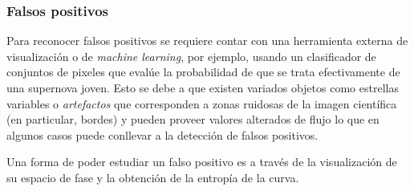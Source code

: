 \subsubsection{Falsos positivos}
Para reconocer falsos positivos se requiere contar con una herramienta externa de visualizaci\'on o de \textit{machine learning}, por ejemplo, usando un clasificador de conjuntos de pixeles que eval\'ue la probabilidad de que se trata efectivamente de una supernova joven. Esto se debe a que existen variados objetos como estrellas variables o \textit{artefactos} que corresponden a zonas ruidosas de la imagen  cient\'ifica (en particular, bordes) y pueden proveer valores alterados de flujo lo que en algunos casos puede conllevar a la detecci\'on de falsos positivos.
\bigskip

Una forma de poder estudiar un falso positivo es a trav\'es de la visualizaci\'on de su espacio de fase y la obtenci\'on de la entrop\'ia de la curva.